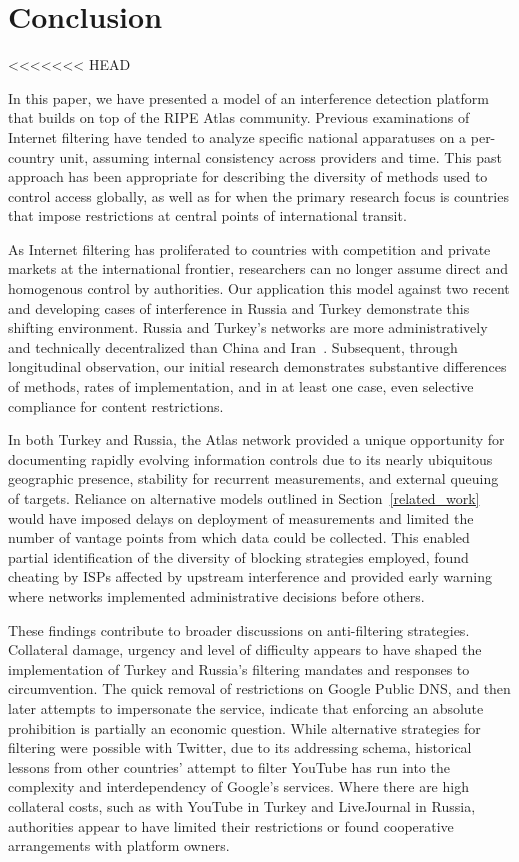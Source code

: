 \section{Conclusion}
\label{sec:conclusion}

<<<<<<< HEAD

In this paper, we have presented a model of an interference detection platform that builds on top of the RIPE Atlas community. Previous examinations of Internet filtering have tended to analyze specific national apparatuses on a per-country unit, assuming internal consistency across providers and time. This past approach has been appropriate for describing the diversity of methods used to control access globally, as well as for when the primary research focus is countries that impose restrictions at central points of international transit. 

As Internet filtering has proliferated to countries with competition and private markets at the international frontier, researchers can no longer assume direct and homogenous control by authorities. Our application this model against two recent and developing cases of interference in Russia and Turkey demonstrate this shifting environment. Russia and Turkey's networks are more administratively and technically decentralized than China and Iran~\cite{Roberts2011}. Subsequent, through longitudinal observation, our initial research demonstrates substantive differences of methods, rates of implementation, and in at least one case, even selective compliance for content restrictions. 

In both Turkey and Russia, the Atlas network provided a unique opportunity for documenting rapidly evolving information controls due to its nearly ubiquitous geographic presence, stability for recurrent measurements, and external queuing of targets. Reliance on alternative models outlined in Section~\ref{related_work} would have imposed delays on deployment of measurements and limited the number of vantage points from which data could be collected. This enabled partial identification of the diversity of blocking strategies employed, found cheating by ISPs affected by upstream interference and provided early warning where networks implemented administrative decisions before others.

These findings contribute to broader discussions on anti-filtering strategies.  Collateral damage, urgency and level of difficulty appears to have shaped the implementation of Turkey and Russia's filtering mandates and responses to circumvention. The quick removal of restrictions on Google Public DNS, and then later attempts to impersonate the service, indicate that enforcing an absolute prohibition is partially an economic question. While alternative strategies for filtering were possible with Twitter, due to its addressing schema, historical lessons from other countries' attempt to filter YouTube has run into the complexity and interdependency of Google's services. Where there are high collateral costs, such as with YouTube in Turkey and LiveJournal in Russia, authorities appear to have limited their restrictions or found cooperative arrangements with platform owners. 

